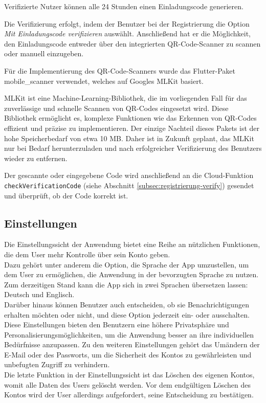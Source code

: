 Verifizierte Nutzer können alle 24 Stunden einen
Einladungscode generieren.

Die Verifizierung erfolgt, indem der Benutzer bei der
Registrierung die Option \textit{Mit Einladungscode verifizieren}
auswählt. Anschließend hat er die Möglichkeit, den
Einladungscode entweder über den integrierten
QR-Code-Scanner zu scannen oder manuell einzugeben.


Für die
Implementierung des QR-Code-Scanners wurde das Flutter-Paket
\cite{mobile_scanner} mobile\_scanner
verwendet, welches auf Googles MLKit \cite{googlemlkit}
basiert.

MLKit ist eine Machine-Learning-Bibliothek, die im
vorliegenden Fall für das zuverlässige und schnelle Scannen
von QR-Codes eingesetzt wird.
Diese Bibliothek ermöglicht es, komplexe Funktionen wie das Erkennen von QR-Codes effizient und präzise zu implementieren. Der einzige Nachteil dieses Pakets ist der hohe Speicherbedarf von etwa 10 MB. Daher ist in Zukunft geplant, das MLKit nur bei Bedarf herunterzuladen und nach erfolgreicher Verifizierung des Benutzers wieder zu entfernen.

Der gescannte oder eingegebene Code wird anschließend an die Cloud-Funktion \texttt{checkVerificationCode} (siehe Abschnitt \ref{subsec:registrierung-verify}) gesendet und überprüft, ob der Code korrekt ist.



\subsection{Einstellungen}
Die Einstellungssicht der Anwendung bietet eine Reihe an nützlichen Funktionen, die dem User mehr Kontrolle über sein Konto geben.
\\
Dazu gehört unter anderem die Option, die Sprache der App umzustellen, um dem User zu ermöglichen, die Anwendung in der bevorzugten Sprache zu nutzen. Zum derzeitigen Stand kann die App sich in zwei Sprachen übersetzen lassen: Deutsch und Englisch.
\\
Darüber hinaus können Benutzer auch entscheiden, ob sie Benachrichtigungen erhalten möchten oder nicht, und diese Option jederzeit ein- oder ausschalten. Diese Einstellungen bieten den Benutzern eine höhere Privatsphäre und Personalisierungsmöglichkeiten, um die Anwendung besser an ihre individuellen Bedürfnisse anzupassen.
Zu den weiteren Einstellungen gehört das Umändern der E-Mail oder des Passworts, um die Sicherheit des Kontos zu gewährleisten und unbefugten Zugriff zu verhindern.
\\
Die letzte Funktion in der Einstellungssicht ist das Löschen des eigenen Kontos, womit alle Daten des Users gelöscht werden. Vor dem endgültigen Löschen des Kontos wird der User allerdings aufgefordert, seine Entscheidung zu bestätigen.

